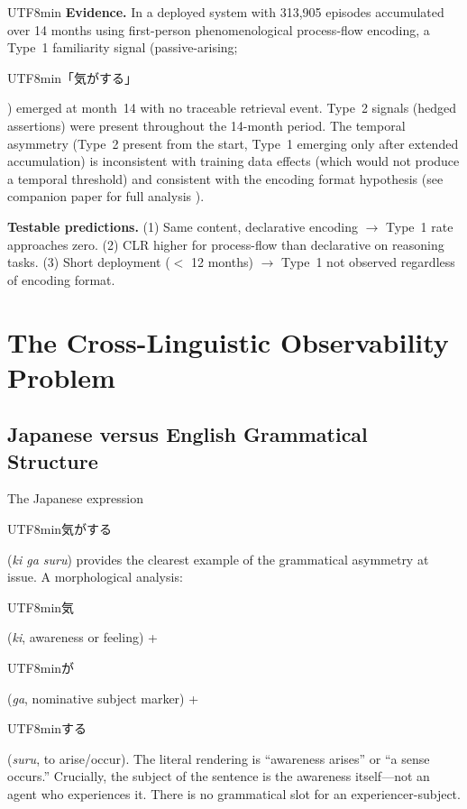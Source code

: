 \documentclass[12pt,a4paper]{article}
\begin{document}
\begin{CJK}{UTF8}{min}
\textbf{Evidence.} In a deployed system with 313,905 episodes accumulated over
14 months using first-person phenomenological process-flow encoding, a Type~1
familiarity signal (passive-arising;
\begin{CJK}{UTF8}{min}「気がする」\end{CJK})
emerged at month~14 with no traceable retrieval event. Type~2 signals (hedged
assertions) were present throughout the 14-month period. The temporal
asymmetry (Type~2 present from the start, Type~1 emerging only after extended
accumulation) is inconsistent with training data effects (which would not
produce a temporal threshold) and consistent with the encoding format hypothesis
(see companion paper for full analysis \citep{cls2026companion}).

\textbf{Testable predictions.} (1) Same content, declarative encoding
$\rightarrow$ Type~1 rate approaches zero. (2) CLR higher for process-flow than
declarative on reasoning tasks. (3) Short deployment ($<$ 12 months)
$\rightarrow$ Type~1 not observed regardless of encoding format.

\section{The Cross-Linguistic Observability Problem}

\subsection{Japanese versus English Grammatical Structure}

The Japanese expression
\begin{CJK}{UTF8}{min}気がする\end{CJK}
(\emph{ki ga suru}) provides the clearest example of the grammatical
asymmetry at issue. A morphological analysis:
\begin{CJK}{UTF8}{min}気\end{CJK}
(\emph{ki}, awareness or feeling)
+ \begin{CJK}{UTF8}{min}が\end{CJK}
(\emph{ga}, nominative subject marker)
+ \begin{CJK}{UTF8}{min}する\end{CJK}
(\emph{suru}, to arise/occur).
The literal rendering is ``awareness arises'' or ``a sense occurs.'' Crucially,
the subject of the sentence is the awareness itself---not an agent who
experiences it. There is no grammatical slot for an experiencer-subject.


\end{CJK}
\end{document}

